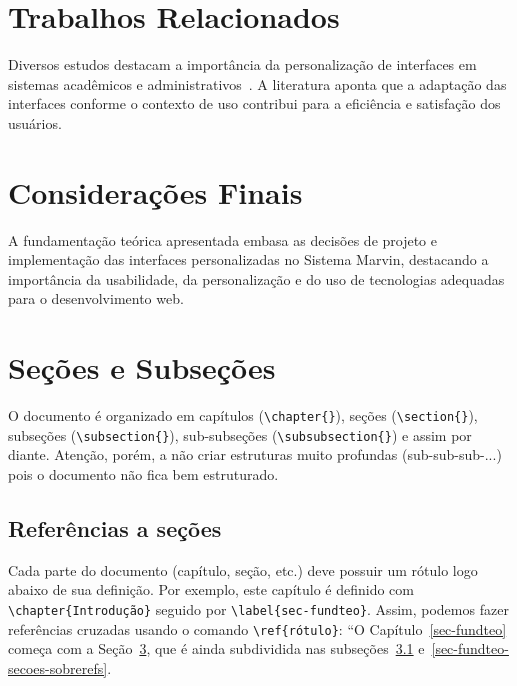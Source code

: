 \section{Trabalhos Relacionados}

Diversos estudos destacam a importância da personalização de interfaces em sistemas acadêmicos e administrativos~\cite{albert1999internet, souza-mylopoulos:spe13}. A literatura aponta que a adaptação das interfaces conforme o contexto de uso contribui para a eficiência e satisfação dos usuários.

\section{Considerações Finais}

A fundamentação teórica apresentada embasa as decisões de projeto e implementação das interfaces personalizadas no Sistema Marvin, destacando a importância da usabilidade, da personalização e do uso de tecnologias adequadas para o desenvolvimento web.



\section{Seções e Subseções}
\label{sec-fundteo-secoes}

O documento é organizado em capítulos (\texttt{\textbackslash chapter\{\}}), seções (\texttt{\textbackslash section\{\}}), subseções (\texttt{\textbackslash subsection\{\}}), sub-subseções (\texttt{\textbackslash subsubsection\{\}}) e assim por diante. Atenção, porém, a não criar estruturas muito profundas (sub-sub-sub-...) pois o documento não fica bem estruturado.


\subsection{Referências a seções}
\label{sec-fundteo-secoes-refs}

Cada parte do documento (capítulo, seção, etc.) deve possuir um rótulo logo abaixo de sua definição. Por exemplo, este capítulo é definido com \texttt{\textbackslash chapter\{Introdução\}} seguido por \texttt{\textbackslash label\{sec-fundteo\}}. Assim, podemos fazer referências cruzadas usando o comando \texttt{\textbackslash ref\{rótulo\}}: ``O Capítulo~\ref{sec-fundteo} começa com a Seção~\ref{sec-fundteo-secoes}, que é ainda subdividida nas subseções~\ref{sec-fundteo-secoes-refs} e~\ref{sec-fundteo-secoes-sobrerefs}.

